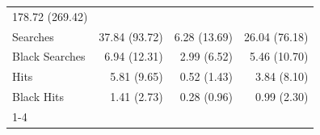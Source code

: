 \begin{table}[!h]
\begin{tabular}{llll}
  \multicolumn{1}{r}{178.72 (269.42)} \\
\multicolumn{1}{l}{\hspace{1em}Searches} &
  \multicolumn{1}{r}{37.84 (93.72)} &
  \multicolumn{1}{r}{6.28 (13.69)} &
  \multicolumn{1}{r}{26.04 (76.18)} \\
\multicolumn{1}{l}{\hspace{1em}Black Searches} &
  \multicolumn{1}{r}{6.94 (12.31)} &
  \multicolumn{1}{r}{2.99 (6.52)} &
  \multicolumn{1}{r}{5.46 (10.70)} \\
\multicolumn{1}{l}{\hspace{1em}Hits} &
  \multicolumn{1}{r}{5.81 (9.65)} &
  \multicolumn{1}{r}{0.52 (1.43)} &
  \multicolumn{1}{r}{3.84 (8.10)} \\
\multicolumn{1}{l}{\hspace{1em}Black Hits} &
  \multicolumn{1}{r}{1.41 (2.73)} &
  \multicolumn{1}{r}{0.28 (0.96)} &
  \multicolumn{1}{r}{0.99 (2.30)} \\
\cline{1-4}
\end{tabular}
\end{table}
